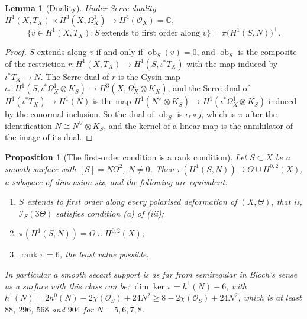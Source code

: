 \documentclass[11pt,reqno]{amsart}
\theoremstyle{plain}
\newtheorem{lemma}[theorem]{Lemma}
\newtheorem{proposition}[theorem]{Proposition}
\theoremstyle{definition}
\theoremstyle{remark}
\newcommand{\CC}{\mathbb{C}}
\newcommand{\cO}{\mathcal{O}}
\newcommand{\cI}{\mathcal{I}}
\begin{document}
\begin{lemma}[Duality]\label{lem:blochduality}
Under Serre duality $H^{1}(X,T_{X})\times H^{3}(X,\Omega^{1}_{X})\to H^{4}(\cO_{X})=\CC$,
\[
  \{v\in H^{1}(X,T_{X}):S\ \text{extends to first order along }v\}
  =\pi\bigl(H^{1}(S,N)\bigr)^{\perp}.
\]
\end{lemma}

\begin{proof}
$S$ extends along $v$ if and only if $\operatorname{ob}_{S}(v)=0$, and
$\operatorname{ob}_{S}$ is the composite of the restriction
$r\colon H^{1}(X,T_{X})\to H^{1}(S,\iota^{*}T_{X})$ with the map induced by
$\iota^{*}T_{X}\to N$. The Serre dual of $r$ is the Gysin map
$\iota_{*}\colon H^{1}(S,\iota^{*}\Omega^{1}_{X}\otimes K_{S})\to H^{3}(X,\Omega^{1}_{X}\otimes K_{X})$,
and the Serre dual of $H^{1}(\iota^{*}T_{X})\to H^{1}(N)$ is the map
$H^{1}(N^{\vee}\otimes K_{S})\to H^{1}(\iota^{*}\Omega^{1}_{X}\otimes K_{S})$
induced by the conormal inclusion. So the dual of $\operatorname{ob}_{S}$ is
$\iota_{*}\circ j$, which is $\pi$ after the identification
$N\cong N^{\vee}\otimes K_{S}$, and the kernel of a linear map is the
annihilator of the image of its dual.
\end{proof}

\begin{proposition}[The first-order condition is a rank condition]
\label{prop:smoothrank}
Let $S\subset X$ be a smooth surface with $[S]=N\Theta^{2}$, $N\ne0$. Then
$\pi(H^{1}(S,N))\supseteq\Theta\cup H^{0,2}(X)$, a subspace of dimension six,
and the following are equivalent:
\begin{enumerate}[label=\textup{(\roman*)},nosep,leftmargin=2.2em]
\item $S$ extends to first order along every polarised deformation of
  $(X,\Theta)$, that is, $\cI_{S}(3\Theta)$ satisfies condition (a) of
  (iii);
\item $\pi(H^{1}(S,N))=\Theta\cup H^{0,2}(X)$;
\item $\operatorname{rank}\pi=6$, the least value possible.
\end{enumerate}
In particular a smooth secant support is as far from semiregular in Bloch's
sense as a surface with this class can be: $\dim\ker\pi=h^{1}(N)-6$, with
$h^{1}(N)=2h^{0}(N)-2\chi(\cO_{S})+24N^{2}\ge8-2\chi(\cO_{S})+24N^{2}$, which
is at least $88$, $296$, $568$ and $904$ for $N=5,6,7,8$.
\end{proposition}
\end{document}
